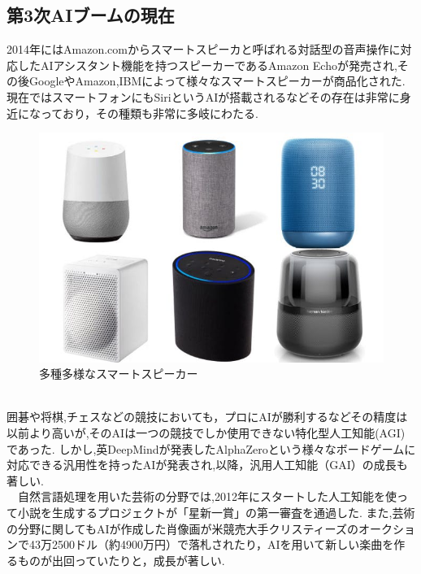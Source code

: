 \subsection{第3次AIブームの現在}
2014年にはAmazon.comからスマートスピーカと呼ばれる対話型の音声操作に対応したAIアシスタント機能を持つスピーカーであるAmazon Echoが発売され,その後GoogleやAmazon,IBMによって様々なスマートスピーカーが商品化された.
現在ではスマートフォンにもSiriというAIが搭載されるなどその存在は非常に身近になっており，その種類も非常に多岐にわたる.
\begin{figure}[!ht]
    \begin{screen}
    \begin{center}
        \includegraphics[scale=0.6, clip]{./img/smartspeaker_list.jpg}
        \caption{多種多様なスマートスピーカー}
        \label{fig:多種多様なスマートスピーカー}
    \end{center}
\end{screen}
\end{figure}\\
\newpage
囲碁や将棋,チェスなどの競技においても，プロにAIが勝利するなどその精度は以前より高いが,そのAIは一つの競技でしか使用できない特化型人工知能(AGI)であった.
しかし,英DeepMindが発表したAlphaZeroという様々なボードゲームに対応できる汎用性を持ったAIが発表され,以降，汎用人工知能（GAI）の成長も著しい.\\
　自然言語処理を用いた芸術の分野では,2012年にスタートした人工知能を使って小説を生成するプロジェクトが「星新一賞」の第一審査を通過した.\cite{webpage2}
また,芸術の分野に関してもAIが作成した肖像画が米競売大手クリスティーズのオークションで43万2500ドル（約4900万円）で落札されたり，AIを用いて新しい楽曲を作るものが出回っていたりと，成長が著しい.\cite{webpage3}\\
\newpage
